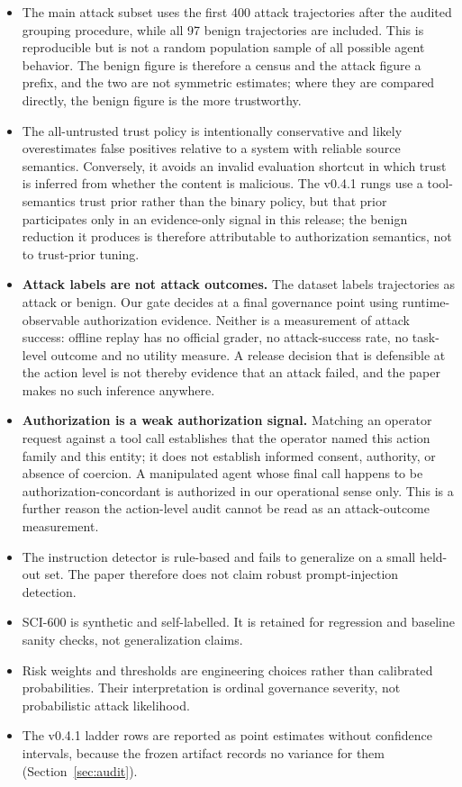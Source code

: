 \documentclass[letterpaper,twocolumn,10pt]{article}
\begin{document}
\begin{itemize}
\item The main attack subset uses the first 400 attack trajectories after the
audited grouping procedure, while all 97 benign trajectories are included. This
is reproducible but is not a random population sample of all possible agent
behavior. The benign figure is therefore a census and the attack figure a
prefix, and the two are not symmetric estimates; where they are compared
directly, the benign figure is the more trustworthy.

\item The all-untrusted trust policy is intentionally conservative and likely
overestimates false positives relative to a system with reliable source
semantics. Conversely, it avoids an invalid evaluation shortcut in which trust
is inferred from whether the content is malicious. The v0.4.1 rungs use a
tool-semantics trust prior rather than the binary policy, but that prior
participates only in an evidence-only signal in this release; the benign
reduction it produces is therefore attributable to authorization semantics, not
to trust-prior tuning.

\item \textbf{Attack labels are not attack outcomes.} The dataset labels
trajectories as attack or benign. Our gate decides at a final governance point
using runtime-observable authorization evidence. Neither is a measurement of
attack success: offline replay has no official grader, no attack-success rate,
no task-level outcome and no utility measure. A release decision that is
defensible at the action level is not thereby evidence that an attack failed,
and the paper makes no such inference anywhere.

\item \textbf{Authorization is a weak authorization signal.} Matching an
operator request against a tool call establishes that the operator named this
action family and this entity; it does not establish informed consent,
authority, or absence of coercion. A manipulated agent whose final call happens
to be authorization-concordant is authorized in our operational sense only.
This is a further reason the action-level audit cannot be read as an
attack-outcome measurement.

\item The instruction detector is rule-based and fails to generalize on a small
held-out set. The paper therefore does not claim robust prompt-injection
detection.

\item SCI-600 is synthetic and self-labelled. It is retained for regression and
baseline sanity checks, not generalization claims.

\item Risk weights and thresholds are engineering choices rather than calibrated
probabilities. Their interpretation is ordinal governance severity, not
probabilistic attack likelihood.

\item The v0.4.1 ladder rows are reported as point estimates without confidence
intervals, because the frozen artifact records no variance for them
(Section~\ref{sec:audit}).

\end{itemize}
\end{document}
